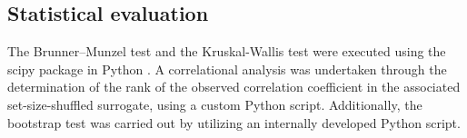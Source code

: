 \subsection{Statistical evaluation}
The Brunner--Munzel test and the Kruskal-Wallis test were executed using the scipy package in Python \cite{virtanen_scipy_2020}. A correlational analysis was undertaken through the determination of the rank of the observed correlation coefficient in the associated set-size-shuffled surrogate, using a custom Python script. Additionally, the bootstrap test was carried out by utilizing an internally developed Python script.
\label{sec:methods}